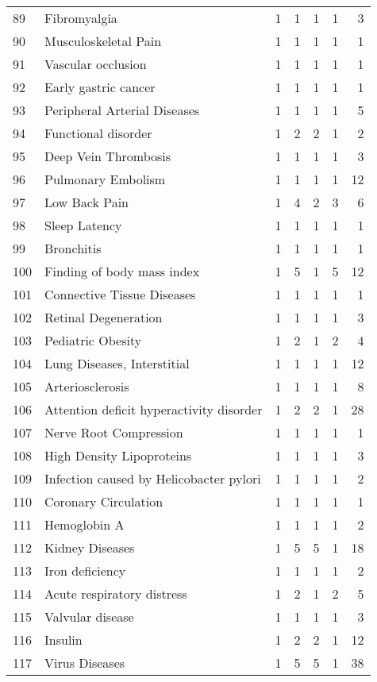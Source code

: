 \begin{tabular}{llrrrrr}
89 & Fibromyalgia & 1 & 1 & 1 & 1 & 3 \\
90 & Musculoskeletal Pain & 1 & 1 & 1 & 1 & 1 \\
91 & Vascular occlusion & 1 & 1 & 1 & 1 & 1 \\
92 & Early gastric cancer & 1 & 1 & 1 & 1 & 1 \\
93 & Peripheral Arterial Diseases & 1 & 1 & 1 & 1 & 5 \\
94 & Functional disorder & 1 & 2 & 2 & 1 & 2 \\
95 & Deep Vein Thrombosis & 1 & 1 & 1 & 1 & 3 \\
96 & Pulmonary Embolism & 1 & 1 & 1 & 1 & 12 \\
97 & Low Back Pain & 1 & 4 & 2 & 3 & 6 \\
98 & Sleep Latency & 1 & 1 & 1 & 1 & 1 \\
99 & Bronchitis & 1 & 1 & 1 & 1 & 1 \\
100 & Finding of body mass index & 1 & 5 & 1 & 5 & 12 \\
101 & Connective Tissue Diseases & 1 & 1 & 1 & 1 & 1 \\
102 & Retinal Degeneration & 1 & 1 & 1 & 1 & 3 \\
103 & Pediatric Obesity & 1 & 2 & 1 & 2 & 4 \\
104 & Lung Diseases, Interstitial & 1 & 1 & 1 & 1 & 12 \\
105 & Arteriosclerosis & 1 & 1 & 1 & 1 & 8 \\
106 & Attention deficit hyperactivity disorder & 1 & 2 & 2 & 1 & 28 \\
107 & Nerve Root Compression & 1 & 1 & 1 & 1 & 1 \\
108 & High Density Lipoproteins & 1 & 1 & 1 & 1 & 3 \\
109 & Infection caused by Helicobacter pylori & 1 & 1 & 1 & 1 & 2 \\
110 & Coronary Circulation & 1 & 1 & 1 & 1 & 1 \\
111 & Hemoglobin A & 1 & 1 & 1 & 1 & 2 \\
112 & Kidney Diseases & 1 & 5 & 5 & 1 & 18 \\
113 & Iron deficiency & 1 & 1 & 1 & 1 & 2 \\
114 & Acute respiratory distress & 1 & 2 & 1 & 2 & 5 \\
115 & Valvular disease & 1 & 1 & 1 & 1 & 3 \\
116 & Insulin & 1 & 2 & 2 & 1 & 12 \\
117 & Virus Diseases & 1 & 5 & 5 & 1 & 38 \\

\end{tabular}
